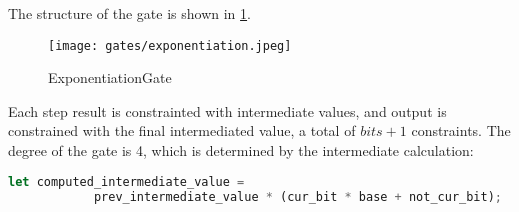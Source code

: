 The structure of the gate is shown in \ref{fig:exponetiation-gate}.
\begin{figure}[!ht]
    \centering
    \texttt{[image: gates/exponentiation.jpeg]}
    \caption{ExponentiationGate}
    \label{fig:exponetiation-gate}
\end{figure}

Each step result is constrainted with intermediate values, and output is constrained with the final intermediated value, a total of $bits + 1$ constraints.
The degree of the gate is 4, which is determined by the intermediate calculation:
\begin{lstlisting}[language=rust]
let computed_intermediate_value =
            prev_intermediate_value * (cur_bit * base + not_cur_bit);
\end{lstlisting}

